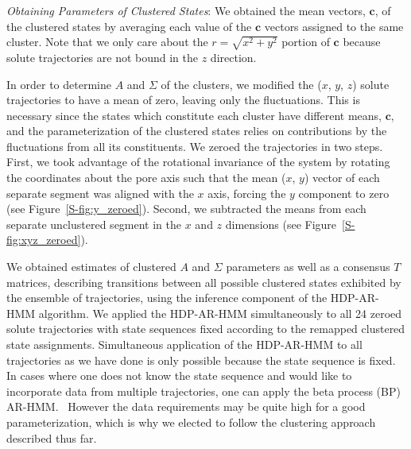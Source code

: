 \documentclass[journal=jpcbfk,manuscript=article]{achemso}
\begin{document}
  \textit{Obtaining Parameters of Clustered States}: We obtained the 
  mean vectors, $\mathbf{c}$, of the clustered states by averaging each 
  value of the $\mathbf{c}$ vectors assigned to the same cluster. Note 
  that we only care about the $r=\sqrt{x^2+y^2}$ portion of $\mathbf{c}$ 
  because solute trajectories are not bound in the $z$ direction.
  
  In order to determine $A$ and $\Sigma$ of the clusters, we modified the 
  ($x$, $y$, $z$) solute trajectories to have a mean of zero, leaving only
  the fluctuations. This is necessary since the states which constitute each 
  cluster have different means, $\mathbf{c}$, and the parameterization of 
  the clustered states relies on contributions by the fluctuations from all
  its constituents. We zeroed the trajectories in two steps. First, we took 
  advantage of the rotational invariance of the system by rotating the coordinates
  about the pore axis such that the mean ($x$, $y$) vector of each separate 
  segment was aligned with the $x$ axis, forcing the $y$ component to zero 
  (see Figure~\ref{S-fig:y_zeroed}). Second, we subtracted the means from each
  separate unclustered segment in the $x$ and $z$ dimensions 
  (see Figure~\ref{S-fig:xyz_zeroed}). 
  
  We obtained estimates of clustered $A$ and $\Sigma$ parameters as well as a
  consensus $T$ matrices, describing transitions between all possible clustered states 
  exhibited by the ensemble of trajectories, using the inference component of 
  the HDP-AR-HMM algorithm. We applied the HDP-AR-HMM simultaneously to all 24
  zeroed solute trajectories with state sequences fixed according to the remapped 
  clustered state assignments. Simultaneous application of the HDP-AR-HMM to 
  all trajectories as we have done is only possible because the state sequence 
  is fixed. In cases where one does not know the state sequence and would like to 
  incorporate data from multiple trajectories, one can apply the beta process (BP)
  AR-HMM.~\cite{fox_sharing_2009} However the data requirements may be quite high
  for a good parameterization, which is why we elected to follow the clustering 
  approach described thus far.
  
\end{document}
